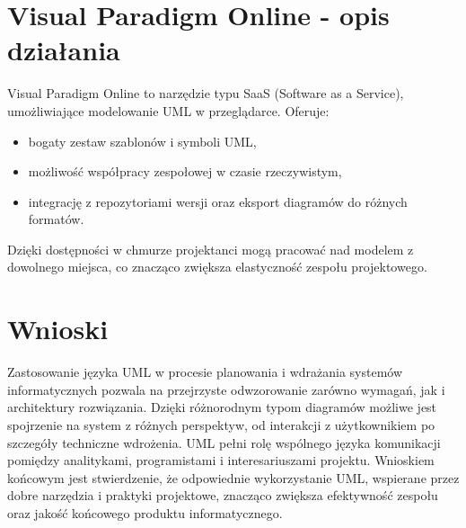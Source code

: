 \documentclass[12pt,a4paper]{article}
\begin{document}
\clearpage

\section{Visual Paradigm Online - opis działania}
Visual Paradigm Online to narzędzie typu SaaS (Software as a Service), umożliwiające modelowanie UML w przeglądarce. Oferuje:
\begin{itemize}
    \item bogaty zestaw szablonów i symboli UML,
    \item możliwość współpracy zespołowej w czasie rzeczywistym,
    \item integrację z repozytoriami wersji oraz eksport diagramów do różnych formatów.
\end{itemize}
Dzięki dostępności w chmurze projektanci mogą pracować nad modelem z dowolnego miejsca, co znacząco zwiększa elastyczność zespołu projektowego.


\section{Wnioski}
Zastosowanie języka UML w procesie planowania i wdrażania systemów informatycznych pozwala na przejrzyste odwzorowanie zarówno wymagań, jak i architektury rozwiązania. Dzięki różnorodnym typom diagramów możliwe jest spojrzenie na system z różnych perspektyw, od interakcji z użytkownikiem po szczegóły techniczne wdrożenia. 
UML pełni rolę wspólnego języka komunikacji pomiędzy analitykami, programistami i interesariuszami projektu. 
Wnioskiem końcowym jest stwierdzenie, że odpowiednie wykorzystanie UML, wspierane przez dobre narzędzia i praktyki projektowe, znacząco zwiększa efektywność zespołu oraz jakość końcowego produktu informatycznego.
\end{document}
